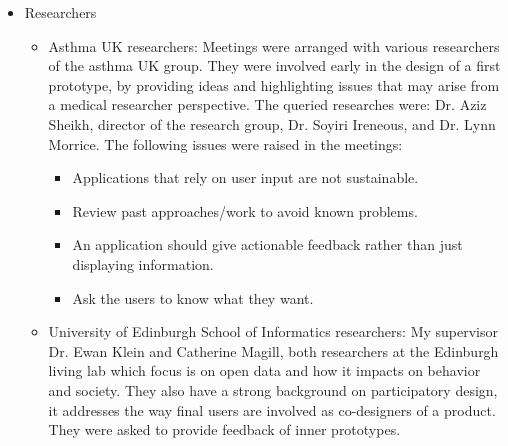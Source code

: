 \begin{itemize}



	\item Researchers 
    \begin{itemize}
      \item Asthma UK researchers: Meetings were arranged with various researchers of the asthma UK group. They were involved early in the design of a first prototype, by providing ideas and highlighting issues that may arise from a medical researcher perspective. The queried researches were:  Dr. Aziz Sheikh, director of the research group, Dr. Soyiri Ireneous, and Dr. Lynn Morrice.
    The following issues were raised in the meetings:
      \begin{itemize}
          \item Applications that rely on user input are not sustainable.
          \item Review past approaches/work to avoid known problems.
          \item An application should give actionable feedback rather than just displaying information.
          \item Ask the users to know what they want.
      \end{itemize}
      \item University of Edinburgh School of Informatics researchers: My supervisor Dr. Ewan Klein and Catherine Magill, both researchers at the Edinburgh living lab which focus is on open data and how it impacts on behavior and society. They also have a strong background on participatory design, it addresses the way final users are involved as co-designers of a product. They were asked to provide feedback of inner prototypes.
	\end{itemize}
    

\end{itemize}
